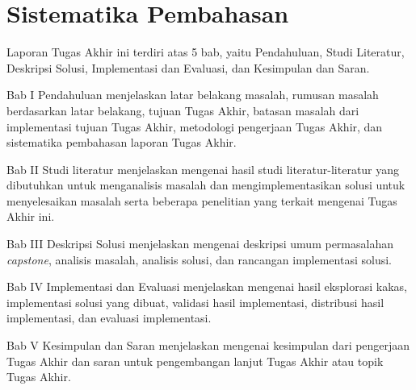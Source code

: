 \section{Sistematika Pembahasan}

Laporan Tugas Akhir ini terdiri atas 5 bab, yaitu Pendahuluan, Studi Literatur,
Deskripsi Solusi, Implementasi dan Evaluasi, dan Kesimpulan dan Saran.

Bab I Pendahuluan menjelaskan latar belakang masalah, rumusan masalah
berdasarkan latar belakang, tujuan Tugas Akhir, batasan masalah dari
implementasi tujuan Tugas Akhir, metodologi pengerjaan Tugas Akhir, dan
sistematika pembahasan laporan Tugas Akhir.

Bab II Studi literatur menjelaskan mengenai hasil studi literatur-literatur yang
dibutuhkan untuk menganalisis masalah dan mengimplementasikan solusi untuk
menyelesaikan masalah serta beberapa penelitian yang terkait mengenai Tugas
Akhir ini.

Bab III Deskripsi Solusi menjelaskan mengenai deskripsi umum permasalahan
\textit{capstone}, analisis masalah, analisis solusi, dan rancangan implementasi
solusi.

Bab IV Implementasi dan Evaluasi menjelaskan mengenai hasil eksplorasi kakas,
implementasi solusi yang dibuat, validasi hasil implementasi, distribusi hasil
implementasi, dan evaluasi implementasi.

Bab V Kesimpulan dan Saran menjelaskan mengenai kesimpulan dari pengerjaan Tugas
Akhir dan saran untuk pengembangan lanjut Tugas Akhir atau topik Tugas Akhir.
